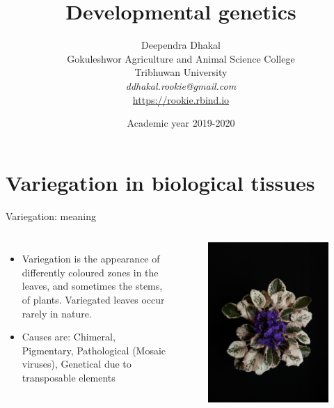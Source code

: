 \documentclass[11pt,dvipsnames,ignorenonframetext,aspectratio=169]{beamer}
\title[]{Developmental genetics}
\author[
        Deependra Dhakal\\
Gokuleshwor Agriculture and Animal Science College\\
Tribhuwan University\\
\textit{ddhakal.rookie@gmail.com}\\
\url{https://rookie.rbind.io}
    ]{Deependra Dhakal\\
Gokuleshwor Agriculture and Animal Science College\\
Tribhuwan University\\
\textit{ddhakal.rookie@gmail.com}\\
\url{https://rookie.rbind.io}}
\date[
      Academic year 2019-2020
  ]{
      Academic year 2019-2020
        }
\begin{document}
  \begin{frame}[plain]
  \titlepage
  \end{frame}



\hypertarget{variegation-in-biological-tissues}{%
\section{Variegation in biological
tissues}\label{variegation-in-biological-tissues}}

\begin{frame}{Variegation: meaning}
\protect\hypertarget{variegation-meaning}{}

\begin{columns}[T,onlytextwidth]
  \small
  
  \begin{itemize}
  \item Variegation is the appearance of differently coloured zones in the leaves, and sometimes the stems, of plants. Variegated leaves occur rarely in nature.
  \item Causes are: Chimeral, Pigmentary, Pathological (Mosaic viruses), Genetical due to transposable elements
  \end{itemize}
  
  
\begin{figure}

{\centering \includegraphics[width=0.68\linewidth]{../images/saintpaulia_ionantha_variegata} 

}
\end{figure}
\end{columns}
\end{frame}
\end{document}
